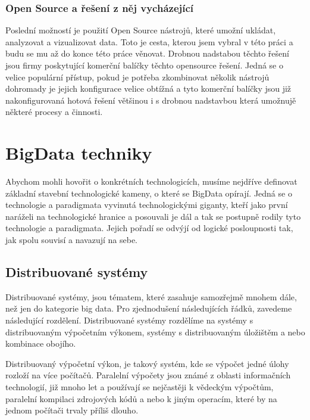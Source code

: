 \documentclass[thesis=M,czech]{FITthesis}[2012/06/26]
\begin{document}
\subsection{Open Source a řešení z něj vycházející} 
Poslední možností je použití Open Source nástrojů, které umožní ukládat, analyzovat a vizualizovat data. Toto je cesta, kterou jsem vybral v této práci a budu se mu až do konce této práce věnovat. Drobnou nadstabou těchto řešení jsou firmy poskytující komerční balíčky těchto opensource řešení. Jedná se o velice populární přístup, pokud je potřeba zkombinovat několik nástrojů dohromady je jejich konfigurace velice obtížná a tyto komerční balíčky jsou již nakonfigurovaná hotová řešení většinou i s drobnou nadstavbou která umožnujě některé procesy a činnosti. 


\chapter{BigData techniky}
Abychom mohli hovořit o konkrétních technologicích, musíme nejdříve definovat základní stavební technologické kameny, o které se BigData opírají. Jedná se o technologie a paradigmata vyvinutá technologickými giganty, kteří jako první naráželi na technologické hranice a posouvali je dál a tak se postupně rodily tyto technologie a paradigmata. Jejich pořadí se odvýjí od logické posloupnosti tak, jak spolu souvisí a navazují na sebe.    

\section{Distribuované systémy}
Distribuované systémy, jsou tématem, které zasahuje samozřejmě mnohem dále, než jen do kategorie big data. Pro zjednodušení následujících řádků, zavedeme následující rozdělení. Distribuované systémy rozdělíme na systémy s distribuovaným výpočetním výkonem, systémy s distribuovaným úložištěm a nebo kombinace obojího. 

Distribuovaný výpočetní výkon, je takový systém, kde se výpočet jedné úlohy rozloží na více počítačů. Paralelní výpočety jsou známé z oblasti informačních technologií, již mnoho let a používají se nejčastěji k vědeckým výpočtům, paralelní kompilaci zdrojových kódů a nebo k jiným operacím, které by na jednom počítači trvaly příliš dlouho. 
\end{document}
